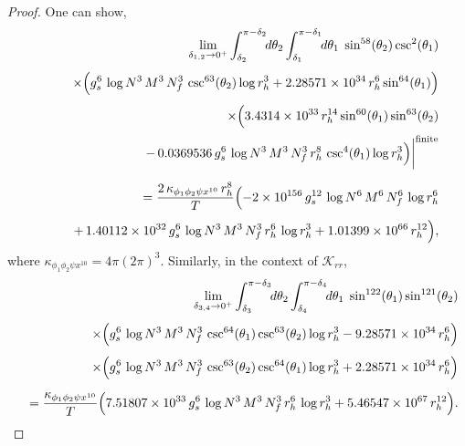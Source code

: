 \documentclass[a4paper,11pt,fleqn]{article}
\theoremstyle{plain}
\theoremstyle{definition}
\newcommand{\rh}{r_h}
\newcommand{\logN}{\log N}
\newcommand{\logrh}{\log r_h}
\begin{document}
\begin{proof}
One can show,
%
\begin{eqnarray}
\label{Kmtheta12integral-finite}
&&\lim_{\delta_{1,2}\rightarrow0^+}
  \int_{\delta_2}^{\pi-\delta_2}\!\!d\theta_2
  \int_{\delta_1}^{\pi-\delta_1}\!\!d\theta_1\;
  \sin^{58}\!\left(\theta_2\right)\csc^2\!\left(\theta_1\right)
\nonumber\\[4pt]
&&\quad\times
  \Bigl(g_s^6\,\logN^3\,M^3\,N_f^3\,
        \csc^{63}\!\left(\theta_2\right)\logrh^3
        + 2.28571\times10^{34}\,\rh^6\sin^{64}\!\left(\theta_1\right)\Bigr)
\nonumber\\[4pt]
&&\quad\times
  \Bigl(3.4314\times10^{33}\,\rh^{14}
        \sin^{60}\!\left(\theta_1\right)\sin^{63}\!\left(\theta_2\right)
\nonumber\\[2pt]
&&\qquad
        -\,0.0369536\,g_s^6\,\logN^3\,M^3\,N_f^3\,\rh^8\,
        \csc^4\!\left(\theta_1\right)\logrh^3\Bigr)
  \bigg|^{\rm finite}
\nonumber\\[6pt]
&&= \frac{2\,\kappa_{\phi_1\phi_2\psi x^{10}}\,\rh^8}{T}
   \Bigl(-2\times10^{156}\,g_s^{12}\,\logN^6\,M^6\,N_f^6\,\logrh^6
\nonumber\\[4pt]
&&\qquad
         +\,1.40112\times10^{32}\,g_s^6\,\logN^3\,M^3\,N_f^3\,\rh^6\,\logrh^3
         + 1.01399\times10^{66}\,\rh^{12}\Bigr),
\end{eqnarray}
%
where $\kappa_{\phi_1\phi_2\psi x^{10}} = 4\pi\left(2\pi\right)^3$.
Similarly, in the context of $\mathcal{K}_{rr}$,
%
\begin{eqnarray}
\label{Krrtheta1theta2-finite}
&&\lim_{\delta_{3,4}\rightarrow0^+}
  \int_{\delta_3}^{\pi-\delta_3}\!\!d\theta_2
  \int_{\delta_4}^{\pi-\delta_4}\!\!d\theta_1\;
  \sin^{122}\!\left(\theta_1\right)\sin^{121}\!\left(\theta_2\right)
\nonumber\\[4pt]
&&\quad\times
  \Bigl(g_s^6\,\logN^3\,M^3\,N_f^3\,
        \csc^{64}\!\left(\theta_1\right)\csc^{63}\!\left(\theta_2\right)\logrh^3
        - 9.28571\times10^{34}\,\rh^6\Bigr)
\nonumber\\[4pt]
&&\quad\times
  \Bigl(g_s^6\,\logN^3\,M^3\,N_f^3\,
        \csc^{63}\!\left(\theta_2\right)\csc^{64}\!\left(\theta_1\right)\logrh^3
        + 2.28571\times10^{34}\,\rh^6\Bigr)
\nonumber\\[6pt]
&&= \frac{\kappa_{\phi_1\phi_2\psi x^{10}}}{T}
   \Bigl(7.51807\times10^{33}\,g_s^6\,\logN^3\,M^3\,N_f^3\,\rh^6\,\logrh^3
         + 5.46547\times10^{67}\,\rh^{12}\Bigr).
\end{eqnarray}


\end{proof}
\end{document}

